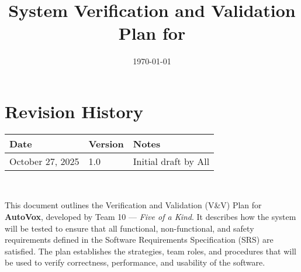 \documentclass[12pt, titlepage]{article}
\begin{document}
\title{System Verification and Validation Plan for \progname{}} 
\author{\authname}
\date{\today}
	
\maketitle


\section*{Revision History}

\begin{tabularx}{\textwidth}{p{3cm}p{2cm}X}
\toprule {\bf Date} & {\bf Version} & {\bf Notes}\\
\midrule
October 27, 2025 & 1.0 & Initial draft by All\\
\bottomrule
\end{tabularx}

~\\
\iffalse
\wss{The intention of the VnV plan is to increase confidence in the software.
However, this does not mean listing every verification and validation technique
that has ever been devised.  The VnV plan should also be a \textbf{feasible}
plan. Execution of the plan should be possible with the time and team available.
If the full plan cannot be completed during the time available, it can either be
modified to ``fake it'', or a better solution is to add a section describing
what work has been completed and what work is still planned for the future.}

\wss{The VnV plan is typically started after the requirements stage, but before
the design stage.  This means that the sections related to unit testing cannot
initially be completed.  The sections will be filled in after the design stage
is complete.  the final version of the VnV plan should have all sections filled
in.}
\fi

\newpage

\tableofcontents

\newpage

\listoftables

\newpage


This document outlines the Verification and Validation (V\&V) Plan for \textbf{AutoVox}, developed by Team 10 --- \textit{Five of a Kind}. It describes how the system will be tested to ensure that all functional, non-functional, and safety requirements defined in the Software Requirements Specification (SRS) are satisfied. The plan establishes the strategies, team roles, and procedures that will be used to verify correctness, performance, and usability of the software.
\end{document}

